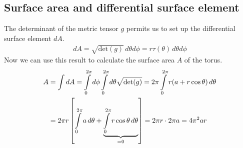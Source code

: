 \documentclass[11pt, DINA4, fleqn]{amsart}
\begin{document}
\subsection{Surface area and differential surface element}
The determinant of the metric tensor $g$ permits us to set up the differential surface element $dA$.
\begin{align}
dA = \sqrt{\text{det}(g)} \, d\theta d\phi = r \tau(\theta) \, d\theta d\phi
\end{align}
Now we can use this result to calculate the surface area $A$ of the torus.
\begin{align}
A &= \int dA = \int \displaylimits_{0}^{2\pi} d\phi \int \displaylimits_{0}^{2\pi} d\theta \sqrt{\text{det}(g)} =
2\pi \int \displaylimits_{0}^{2\pi}  r (a + r\cos\theta) \, d\theta \\
&= 2\pi r\left[
\int \displaylimits_{0}^{2\pi} a \, d\theta + \underbrace{\int \displaylimits_{0}^{2\pi} r\cos\theta \, d\theta}_{=0}
\right]
= 2\pi r \cdot 2\pi a = 4\pi^2 ar
\end{align}
\end{document}
